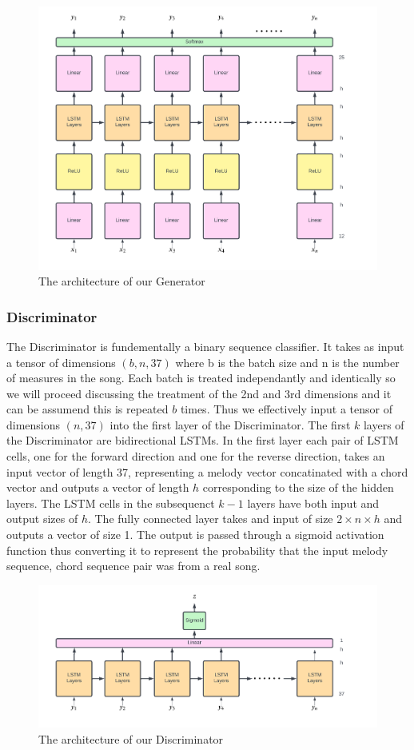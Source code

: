 \begin{figure}
    \centering
    \includegraphics[width=0.8\columnwidth]{Figures/Generator}
    \decoRule
    \caption{The architecture of our Generator}
    \label{fig:Generator}
\end{figure}

\subsubsection{Discriminator}
The Discriminator is fundementally a binary sequence classifier.
It takes as input a tensor of dimensions $(b,n,37)$ where b is the batch size and n is the number of measures in the song.
Each batch is treated independantly and identically so we will proceed discussing the treatment of the 2nd and 3rd dimensions and it can be assumend this is repeated $b$ times.
Thus we effectively input a tensor of dimensions $(n,37)$ into the first layer of the Discriminator.
The first $k$ layers of the Discriminator are bidirectional LSTMs. 
In the first layer each pair of LSTM cells, one for the forward direction and one for the reverse direction, takes an input vector of length 37, representing a melody vector concatinated with a chord vector and outputs a vector of length $h$ corresponding to the size of the hidden layers.
The LSTM cells in the subsequenct $k-1$ layers have both input and output sizes of $h$.
The fully connected layer takes and input of size $2 \times n \times h$ and outputs a vector of size 1.
The output is passed through a sigmoid activation function thus converting it to represent the probability that the input melody sequence, chord sequence pair was from a real song.

\begin{figure}
    \centering
    \includegraphics[width=0.8\columnwidth]{Figures/Discriminator}
    \decoRule
    \caption{The architecture of our Discriminator}
    \label{fig:Discriminator}
\end{figure}


